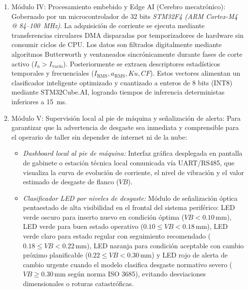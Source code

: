 \begin{enumerate}[leftmargin=0.8cm]
    \item Módulo IV: Procesamiento embebido y Edge AI (Cerebro mecatrónico):
    Gobernado por un microcontrolador de 32 bits \textit{STM32F4 (ARM Cortex-M4 @ 84--100~MHz)}. La adquisición de corriente se ejecuta mediante transferencias circulares DMA disparadas por temporizadores de hardware sin consumir ciclos de CPU. Los datos son filtrados digitalmente mediante algoritmos Butterworth y ventaneados sincrónicamente durante fases de corte activo ($I_a > I_{\text{vacío}}$). Posteriormente se extraen descriptores estadísticos temporales y frecuenciales ($I_{\text{RMS}}, a_{\text{RMS}}, Ku, CF$). Estos vectores alimentan un clasificador inteligente optimizado y cuantizado a enteros de 8 bits (INT8) mediante STM32Cube.AI, logrando tiempos de inferencia deterministas inferiores a 15~ms.
    
    \item Módulo V: Supervisión local al pie de máquina y señalización de alerta:
    Para garantizar que la advertencia de desgaste sea inmediata y comprensible para el operario de taller sin depender de internet ni de la nube:
    \begin{itemize}
        \item \textit{Dashboard local al pie de máquina:} Interfaz gráfica desplegada en pantalla de gabinete o estación técnica local comunicada vía UART/RS485, que visualiza la curva de evolución de corriente, el nivel de vibración y el valor estimado de desgaste de flanco ($VB$).
        \item \textit{Clasificador LED por niveles de desgaste:} Módulo de señalización óptica pentaestado de alta visibilidad en el frontal del sistema periférico: LED verde oscuro para inserto nuevo en condición óptima ($VB < 0.10\,\text{mm}$), LED verde para buen estado operativo ($0.10 \le VB < 0.18\,\text{mm}$), LED verde claro para estado regular con seguimiento recomendado ($0.18 \le VB < 0.22\,\text{mm}$), LED naranja para condición aceptable con cambio próximo planificable ($0.22 \le VB < 0.30\,\text{mm}$) y LED rojo de alerta de cambio urgente cuando el modelo clasifica desgaste normativo severo ($VB \ge 0.30\,\text{mm}$ según norma ISO 3685), evitando desviaciones dimensionales o roturas catastróficas.
    \end{itemize}
\end{enumerate}
